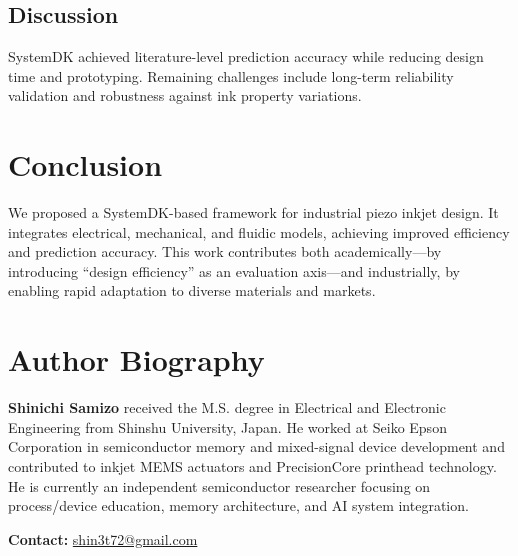 \documentclass[conference]{IEEEtran}
\begin{document}
\subsection{Discussion}
SystemDK achieved literature-level prediction accuracy while reducing design time and prototyping. 
Remaining challenges include long-term reliability validation and robustness against ink property variations.

\section{Conclusion}
We proposed a SystemDK-based framework for industrial piezo inkjet design. 
It integrates electrical, mechanical, and fluidic models, achieving improved efficiency and prediction accuracy. 
This work contributes both academically—by introducing ``design efficiency'' as an evaluation axis—and industrially, by enabling rapid adaptation to diverse materials and markets.




\section*{Author Biography}
\textbf{Shinichi Samizo} received the M.S. degree in Electrical and Electronic Engineering from Shinshu University, Japan. 
He worked at Seiko Epson Corporation in semiconductor memory and mixed-signal device development and contributed to inkjet MEMS actuators and PrecisionCore printhead technology. 
He is currently an independent semiconductor researcher focusing on process/device education, memory architecture, and AI system integration.  

\textbf{Contact:} \href{mailto:shin3t72@gmail.com}{shin3t72@gmail.com}
\end{document}
